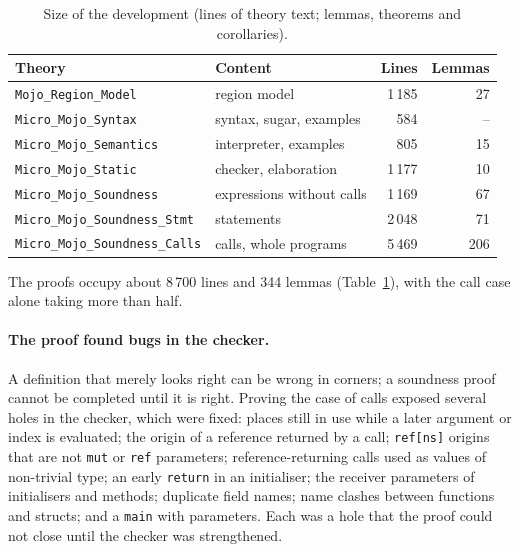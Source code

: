 \documentclass[11pt,a4paper]{article}
\newcommand{\code}[1]{\texttt{#1}}
\begin{document}
\begin{table}[t]
\centering\small
\begin{tabular}{@{}llrr@{}}
\toprule
Theory & Content & Lines & Lemmas\\
\midrule
\code{Mojo\_Region\_Model} & region model & 1\,185 & 27\\
\code{Micro\_Mojo\_Syntax} & syntax, sugar, examples & 584 & --\\
\code{Micro\_Mojo\_Semantics} & interpreter, examples & 805 & 15\\
\code{Micro\_Mojo\_Static} & checker, elaboration & 1\,177 & 10\\
\code{Micro\_Mojo\_Soundness} & expressions without calls & 1\,169 & 67\\
\code{Micro\_Mojo\_Soundness\_Stmt} & statements & 2\,048 & 71\\
\code{Micro\_Mojo\_Soundness\_Calls} & calls, whole programs & 5\,469 & 206\\
\bottomrule
\end{tabular}
\caption{Size of the development (lines of theory text; lemmas, theorems and
corollaries).}
\label{tab:effort}
\end{table}
The proofs occupy about 8\,700 lines and 344 lemmas (Table~\ref{tab:effort}),
with the call case alone taking more than half.

\paragraph{The proof found bugs in the checker.}
A definition that merely looks right can be wrong in corners; a soundness proof
cannot be completed until it is right. Proving the case of calls exposed several
holes in the checker, which were fixed: places still in use while a later
argument or index is evaluated; the origin of a reference returned by a call;
\code{ref[ns]} origins that are not \code{mut} or \code{ref} parameters;
reference-returning calls used as values of non-trivial type; an early
\code{return} in an initialiser; the receiver parameters of initialisers and
methods; duplicate field names; name clashes between functions and structs; and a
\code{main} with parameters. Each was a hole that the proof could not close
until the checker was strengthened.
\end{document}
